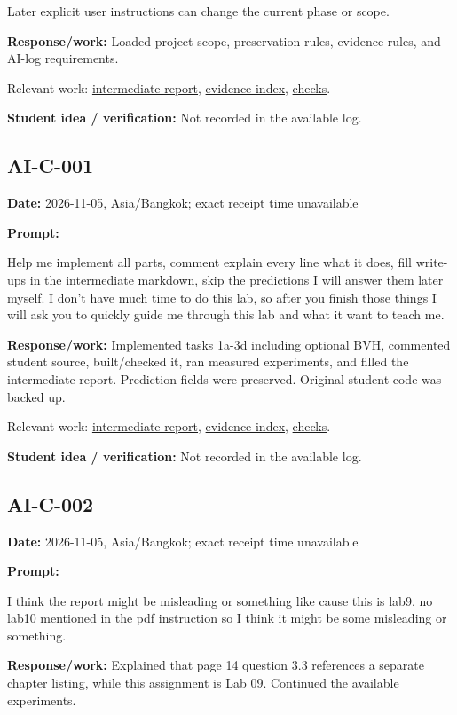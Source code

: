 \documentclass[11pt,a4paper]{article}
\begin{document}
\begin{prompt}
Later explicit user instructions can change the current phase or scope.
\end{prompt}
\noindent\textbf{Response/work:} Loaded project scope, preservation rules, evidence rules, and AI-log requirements.

Relevant work: \href{https://github.com/Champy2005/Lab09-RayTracing/blob/main/docs/report/intermediate-report.md}{intermediate report}, \href{https://github.com/Champy2005/Lab09-RayTracing/blob/main/evidence/README.md}{evidence index}, \href{https://github.com/Champy2005/Lab09-RayTracing/blob/main/evidence/terminal/verification.txt}{checks}.\par
\noindent\textbf{Student idea / verification:} Not recorded in the available log.\par\medskip
{}\subsection*{AI-C-001}
\noindent\textbf{Date:} 2026-11-05, Asia/\allowbreak{}Bangkok; exact receipt time unavailable\par
\noindent\textbf{Prompt:}
\begin{prompt}
Help me implement all parts, comment explain every line what it does, fill write-ups in
the intermediate markdown, skip the predictions I will answer them later myself. I don't
have much time to do this lab, so after you finish those things I will ask you to quickly
 guide me through this lab and what it want to teach me.
\end{prompt}
\noindent\textbf{Response/work:} Implemented tasks 1a-3d including optional BVH, commented student source, built/\allowbreak{}checked it, ran measured experiments, and filled the intermediate report. Prediction fields were preserved. Original student code was backed up.

Relevant work: \href{https://github.com/Champy2005/Lab09-RayTracing/blob/main/docs/report/intermediate-report.md}{intermediate report}, \href{https://github.com/Champy2005/Lab09-RayTracing/blob/main/evidence/README.md}{evidence index}, \href{https://github.com/Champy2005/Lab09-RayTracing/blob/main/evidence/terminal/verification.txt}{checks}.\par
\noindent\textbf{Student idea / verification:} Not recorded in the available log.\par\medskip
{}\subsection*{AI-C-002}
\noindent\textbf{Date:} 2026-11-05, Asia/\allowbreak{}Bangkok; exact receipt time unavailable\par
\noindent\textbf{Prompt:}
\begin{prompt}
I think the report might be misleading or something like cause this is lab9. no lab10
mentioned in the pdf instruction so I think it might be some misleading or something.
\end{prompt}
\noindent\textbf{Response/work:} Explained that page 14 question 3.3 references a separate chapter listing, while this assignment is Lab 09. Continued the available experiments.
\end{document}
